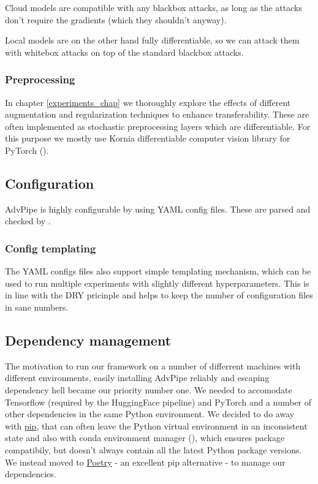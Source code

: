 Cloud models are compatible with any blackbox attacks, as long as the attacks don't require the gradients (which they shouldn't anyway).

Local models are on the other hand fully differentiable, so we can attack them with whitebox attacks on top of the standard blackbox attacks. 

\subsubsection{Preprocessing}
In chapter \ref{experiments_chap} we thoroughly explore the effects of different augmentation and regularization techniques to enhance transferability. These are often implemented as stochastic preprocessing layers which are differentiable. For this purpose we mostly use Kornia \textendash \space differentiable computer vision library for PyTorch (\cite{riba2019kornia}).

\subsection{Configuration}
AdvPipe is highly configurable by using YAML config files. These are parsed and checked by .


\subsubsection{Config templating}
The YAML configs files also support simple templating mechanism, which can be used to run multiple experiments with slightly different hyperparameters. This is in line with the DRY pricinple and helps to keep the number of configuration files in sane numbers.

\subsection{Dependency management}
The motivation to run our framework on a number of differrent machines with different environments, easily installing AdvPipe reliably and escaping dependency hell became our priority number one. We needed to accomodate Tensorflow (required by the HuggingFace pipeline) and PyTorch and a number of other dependencies in the same Python environment. We decided to do away with \href{https://pip.pypa.io/en/stable/}{pip}, that can often leave the Python virtual environment in an inconsistent state and also with conda environment manager (\cite{anaconda}), which ensures package compatibily, but doesn't always contain all the latest Python package versions. We instead moved to \href{https://python-poetry.org/}{Poetry} - an excellent pip alternative - to manage our dependencies.
